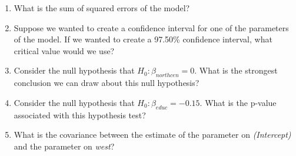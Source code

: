 \begin{enumerate}
\item What is the sum of squared errors of the model?

\item Suppose we wanted to create a confidence interval for one of the parameters of the model. If we wanted to create a 97.50\% confidence interval, what critical value would we use?

\item Consider the null hypothesis that $H_0:\beta_{northcen}=0$. What is the strongest conclusion we can draw about this null hypothesis?

\item Consider the null hypothesis that $H_0:\beta_{educ}=-0.15$. What is the p-value associated with this hypothesis test?

\item What is the covariance between the estimate of the parameter on \textit{(Intercept)} and the parameter on \textit{west}?


\end{enumerate}
